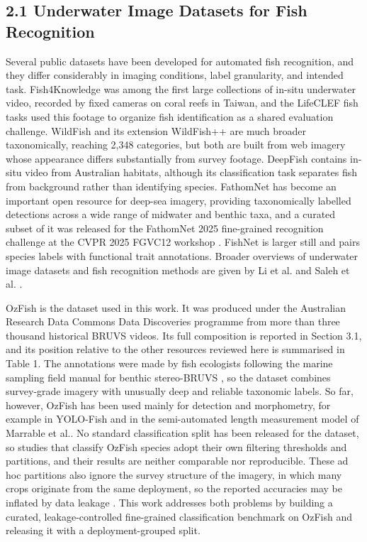 \documentclass[preprint,12pt]{elsarticle}
\begin{document}
\subsection*{2.1 Underwater Image Datasets for Fish
Recognition}\label{underwater-image-datasets-for-fish-recognition}

Several public datasets have been developed for automated fish
recognition, and they differ considerably in imaging conditions, label
granularity, and intended task. Fish4Knowledge
\cite{ref3} was among the first large
collections of in-situ underwater video, recorded by fixed cameras on
coral reefs in Taiwan, and the LifeCLEF fish tasks
\cite{ref27} used this footage to organize fish
identification as a shared evaluation challenge. WildFish
\cite{ref28} and its extension WildFish++
\cite{ref29} are much broader taxonomically,
reaching 2,348 categories, but both are built from web imagery whose
appearance differs substantially from survey footage. DeepFish
\cite{ref9} contains in-situ video from
Australian habitats, although its classification task separates fish
from background rather than identifying species. FathomNet
\cite{ref30} has become an important open
resource for deep-sea imagery, providing taxonomically labelled
detections across a wide range of midwater and benthic taxa, and a
curated subset of it was released for the FathomNet 2025 fine-grained
recognition challenge at the CVPR 2025 FGVC12 workshop
\cite{ref30}. FishNet
\cite{ref10} is larger still and pairs species
labels with functional trait annotations. Broader overviews of
underwater image datasets and fish recognition methods are given by Li
et al. \cite{ref5} and Saleh et al.
\cite{ref6} .

OzFish \cite{ref22} is the dataset used in this
work. It was produced under the Australian Research Data Commons Data
Discoveries programme from more than three thousand historical BRUVS
videos. Its full composition is reported in Section 3.1, and its
position relative to the other resources reviewed here is summarised in
Table 1. The annotations were made by fish ecologists following the
marine sampling field manual for benthic stereo-BRUVS
\cite{ref4}, so the dataset combines
survey-grade imagery with unusually deep and reliable taxonomic labels.
So far, however, OzFish has been used mainly for detection and
morphometry, for example in YOLO-Fish
\cite{ref7} and in the semi-automated length
measurement model of Marrable et
al.\cite{ref19}. No standard classification
split has been released for the dataset, so studies that classify OzFish
species adopt their own filtering thresholds and partitions, and their
results are neither comparable nor reproducible. These ad hoc partitions
also ignore the survey structure of the imagery, in which many crops
originate from the same deployment, so the reported accuracies may be
inflated by data leakage \cite{ref17}
\cite{ref20}. This work addresses both problems
by building a curated, leakage-controlled fine-grained classification
benchmark on OzFish and releasing it with a deployment-grouped split.
\end{document}
